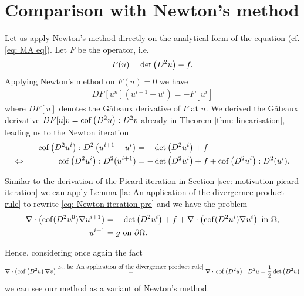 \section{Comparison with Newton's method}

Let us apply Newton's method directly on the analytical form of the \MA equation (cf. \eqref{eq: MA eq}).
Let $F$ be the \MA operator, i.e. 
\[
	F(u) = \det{\left(D^2 u\right)} -f.
\]
Applying Newton's method on $F(u) =0$ we have
\begin{align}
	DF[u^n](u^{i+1}-u^i) = -F[u^i]
\end{align}
where $DF[u]$ denotes the G\^ateaux derivative of $F$ at $u$. We derived the G\^ateaux derivative $DF[u] v = \operatorname{cof} \left( D^2 u \right):D^2v$ already in Theorem \ref{thm: linearisation}, leading us to the Newton iteration
\begin{align}
	\operatorname{cof} \left( D^2 u^i \right):D^2\left(u^{i+1}-u^i\right) &= -\det{\left(D^2 u^i\right)}+f \nonumber \\
	\Leftrightarrow \qquad \qquad  \operatorname{cof} \left( D^2 u^i \right):D^2(u^{i+1}) &= -\det{\left(D^2 u^i\right)} +f  +\operatorname{cof} \left( D^2 u^i \right):D^2(u^i). \label{eq: Newton iteration pre}
\end{align}

Similar to the derivation of the Picard iteration in Section \ref{sec: motivation picard iteration} we can apply Lemma \ref{la: An application of the divergernce product rule} to rewrite \eqref{eq: Newton iteration pre} and we have the problem
\begin{align}
	\nabla \cdot \left( \operatorname{cof}(D^2 u^0) \nabla u^{i+1} \right) &= -\det{\left(D^2u^i\right)} +f+\nabla \cdot \left( \operatorname{cof}(D^2 u^i) \nabla u^{i} \right)  \textnormal{ in } \Omega,  \label{eq: Newton iteration}\\
	u^{i+1} &= g \textnormal{ on } \partial \Omega .
\end{align}

Hence, considering once again the fact 
\[
\nabla \cdot \left( \operatorname{cof} \left( D^2 u  \right) \nabla v \right)
\stackrel{La.\ref{la: An application of the divergernce product rule}}=\nabla \cdot {}\operatorname{cof} \left( D^2 u \right):D^2u
=\frac 1 2 \det{\left(D^2u\right)}
\]
we can see our method as a variant of Newton's method. 

